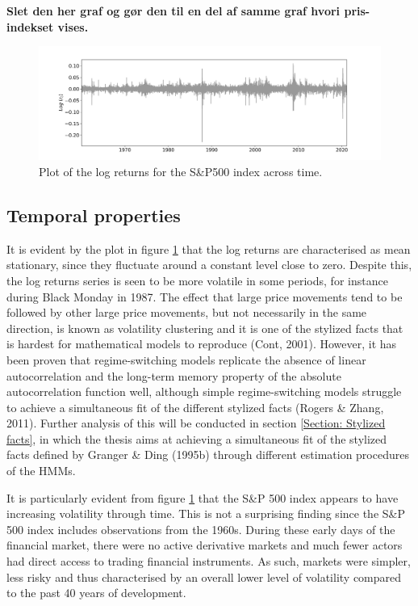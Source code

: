 \textbf{Slet den her graf og gør den til en del af samme graf hvori pris-indekset vises.}
\begin{figure}[H] 
    \centering
    \includegraphics[width=1\textwidth]{analysis/data_description/images/SP500_log_returns.png}
    \caption [Plot of the log returns for the S\&P500 index across time] {Plot of the log returns for the S\&P500 index across time.}
    \label{fig: log_returns_all_indices}
\end{figure}

\label{subsection: distributional properties}

\subsection{Temporal properties}
\label{subsection: temporal properties}
It is evident by the plot in figure \ref{fig: log_returns_all_indices} that the log returns are characterised as mean stationary, since they fluctuate around a constant level close to zero. Despite this, the log returns series is seen to be more volatile in some periods, for instance during Black Monday in 1987. The effect that large price movements tend to be followed by other large price movements, but not necessarily in the same direction, is known as volatility clustering and it is one of the stylized facts that is hardest for mathematical models to reproduce (Cont, 2001). However, it has been proven that regime-switching models replicate the absence of linear autocorrelation and the long-term memory property of the absolute autocorrelation function well, although simple regime-switching models struggle to achieve a simultaneous fit of the
different stylized facts (Rogers \& Zhang, 2011). Further analysis of this will be conducted in section \ref{Section: Stylized facts}, in which the thesis aims at achieving a simultaneous fit of the stylized facts defined by Granger \& Ding (1995b) through different estimation procedures of the HMMs.

It is particularly evident from figure \ref{fig: log_returns_all_indices} that the S\&P 500 index appears to have increasing volatility through time. This is not a surprising finding since the S\&P 500 index includes observations from the 1960s. During these early days of the financial market, there were no active derivative markets and much fewer actors had direct access to trading financial instruments. As such, markets were simpler, less risky and thus characterised by an overall lower level of volatility compared to the past 40 years of development.

